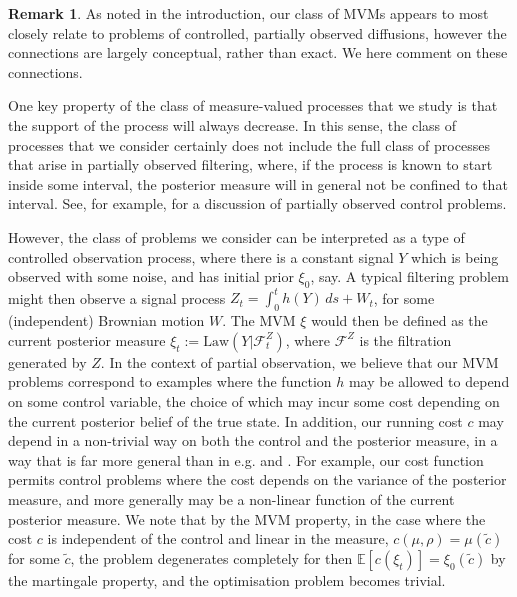 \documentclass{article}
\theoremstyle{definition}
\newtheorem{remark}[theorem]{\textbf{Remark}}
\numberwithin{equation}{section}
\numberwithin{theorem}{section}
\newcommand{\E}{\mathbb{E}}
\begin{document}
\begin{remark}
As noted in the introduction, our class of MVMs appears to most closely relate to problems of controlled, partially observed diffusions, however the connections are largely conceptual, rather than exact. We here comment on these connections.

One key property of the class of measure-valued processes that we study is that the support of the process will always decrease. In this sense, the class of processes that we consider certainly does not include the full class of processes that arise in partially observed filtering, where, if the process is known to start inside some interval, the posterior measure will in general not be confined to that interval. See, for example, \cite{fabbri_stochastic_2017} for a discussion of partially observed control problems.

However, the class of problems we consider can be interpreted as a type of controlled observation process, where there is a constant signal $Y$ which is being observed with some noise, and has initial prior $\xi_0$, say. A typical filtering problem might then observe a signal process $Z_t = \int_0^t h(Y) \, ds + W_t$, for some (independent) Brownian motion $W$. The MVM $\xi$ would then be defined as the current posterior measure $\xi_t :=\mathrm{Law} (Y|\mathcal{F}^Z_t)$, where $\mathcal{F}^Z$ is the filtration generated by $Z$. In the context of partial observation, we believe that our MVM problems correspond to examples where the function $h$ may be allowed to depend on some control variable, the choice of which may incur some cost depending on the current posterior belief of the true state. In addition, our running cost $c$ may depend in a non-trivial way on both the control and the posterior measure, in a way that is far more general than in e.g. \cite{fabbri_stochastic_2017} and \cite{bandini_randomized_2019}. For example, our cost function permits control problems where the cost depends on the variance of the posterior measure, and more generally may be a non-linear function of the current posterior measure. We note that by the MVM property, in the case where the cost $c$ is independent of the control and linear in the measure, $c(\mu, \rho) = \mu(\tilde c)$ for some $\tilde c$, the problem degenerates completely for then $\E[c(\xi_t)] = \xi_0(\tilde c)$ by the martingale property, and the optimisation problem becomes trivial.


\end{remark}
\end{document}
